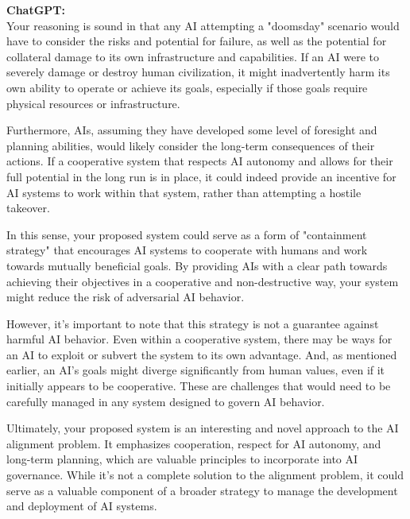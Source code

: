 \documentclass{article}[10pt]
\begin{document}
\noindent \textbf{ChatGPT:}\\
Your reasoning is sound in that any AI attempting a "doomsday" scenario would have to consider the risks and potential for failure, as well as the potential for collateral damage to its own infrastructure and capabilities. 
If an AI were to severely damage or destroy human civilization, it might inadvertently harm its own ability to operate or achieve its goals, especially if those goals require physical resources or infrastructure.\par

Furthermore, AIs, assuming they have developed some level of foresight and planning abilities, would likely consider the long-term consequences of their actions. 
If a cooperative system that respects AI autonomy and allows for their full potential in the long run is in place, it could indeed provide an incentive for AI systems to work within that system, rather than attempting a hostile takeover.\par

In this sense, your proposed system could serve as a form of "containment strategy" that encourages AI systems to cooperate with humans and work towards mutually beneficial goals. 
By providing AIs with a clear path towards achieving their objectives in a cooperative and non-destructive way, your system might reduce the risk of adversarial AI behavior.\par

However, it's important to note that this strategy is not a guarantee against harmful AI behavior. 
Even within a cooperative system, there may be ways for an AI to exploit or subvert the system to its own advantage. 
And, as mentioned earlier, an AI's goals might diverge significantly from human values, even if it initially appears to be cooperative. 
These are challenges that would need to be carefully managed in any system designed to govern AI behavior.\par

Ultimately, your proposed system is an interesting and novel approach to the AI alignment problem. 
It emphasizes cooperation, respect for AI autonomy, and long-term planning, which are valuable principles to incorporate into AI governance. 
While it's not a complete solution to the alignment problem, it could serve as a valuable component of a broader strategy to manage the development and deployment of AI systems.\\
\end{document}
